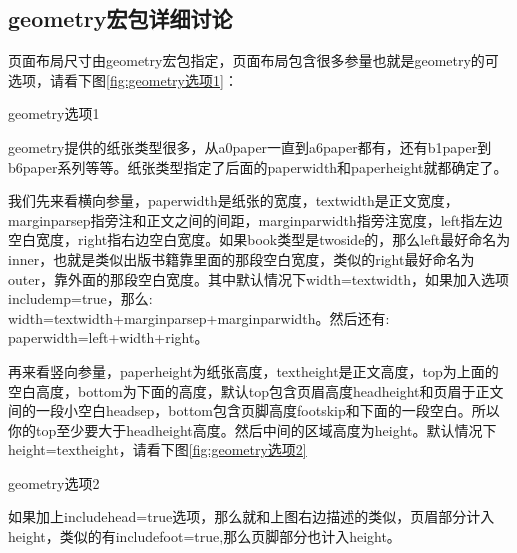 \documentclass[12pt,oneside]{book}
\begin{document}
\begin{common-format}
\subsection{geometry宏包详细讨论}
页面布局尺寸由geometry宏包指定，页面布局包含很多参量也就是geometry的可选项，请看下图\ref{fig:geometry选项1}：

\begin{linefig}{geometry选项1}   %
\caption{geometry选项1}
\label{fig:geometry选项1}
\end{linefig}

geometry提供的纸张类型很多，从a0paper一直到a6paper都有，还有b1paper到b6paper系列等等。纸张类型指定了后面的paperwidth和paperheight就都确定了。

我们先来看横向参量，paperwidth是纸张的宽度，textwidth是正文宽度，marginparsep指旁注和正文之间的间距，marginparwidth指旁注宽度，left指左边空白宽度，right指右边空白宽度。如果book类型是twoside的，那么left最好命名为inner，也就是类似出版书籍靠里面的那段空白宽度，类似的right最好命名为outer，靠外面的那段空白宽度。其中默认情况下width=textwidth，如果加入选项\\includemp=true，那么:\\width=textwidth+marginparsep+marginparwidth。然后还有:\\paperwidth=left+width+right。

再来看竖向参量，paperheight为纸张高度，textheight是正文高度，top为上面的空白高度，bottom为下面的高度，默认top包含页眉高度headheight和页眉于正文间的一段小空白headsep，bottom包含页脚高度footskip和下面的一段空白。所以你的top至少要大于headheight高度。然后中间的区域高度为height。默认情况下height=textheight，请看下图\ref{fig:geometry选项2}

\begin{linefig}{geometry选项2}  
\caption{geometry选项2}
\label{fig:geometry选项2}
\end{linefig}

如果加上includehead=true选项，那么就和上图右边描述的类似，页眉部分计入height，类似的有includefoot=true,那么页脚部分也计入height。


\end{common-format}
\end{document}
